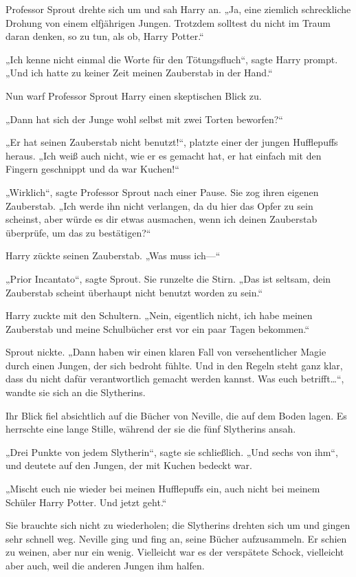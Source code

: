 {Professor Sprout drehte sich um und sah Harry an. „Ja, eine ziemlich schreckliche Drohung von einem elfjährigen Jungen. Trotzdem solltest du nicht im Traum daran denken, so zu tun, als ob, Harry Potter.“

„Ich kenne nicht einmal die Worte für den Tötungsfluch“, sagte Harry prompt. „Und ich hatte zu keiner Zeit meinen Zauberstab in der Hand.“

Nun warf Professor Sprout Harry einen skeptischen Blick zu.

„Dann hat sich der Junge wohl selbst mit zwei Torten beworfen?“

„Er hat seinen Zauberstab nicht benutzt!“, platzte einer der jungen Hufflepuffs heraus. „Ich weiß auch nicht, wie er es gemacht hat, er hat einfach mit den Fingern geschnippt und da war Kuchen!“

„Wirklich“, sagte Professor Sprout nach einer Pause. Sie zog ihren eigenen Zauberstab. „Ich werde ihn nicht verlangen, da du hier das Opfer zu sein scheinst, aber würde es dir etwas ausmachen, wenn ich deinen Zauberstab überprüfe, um das zu bestätigen?“

Harry zückte seinen Zauberstab. „Was muss ich—“

„Prior Incantato“, sagte Sprout. Sie runzelte die Stirn. „Das ist seltsam, dein Zauberstab scheint überhaupt nicht benutzt worden zu sein.“

Harry zuckte mit den Schultern. „Nein, eigentlich nicht, ich habe meinen Zauberstab und meine Schulbücher erst vor ein paar Tagen bekommen.“

Sprout nickte. „Dann haben wir einen klaren Fall von versehentlicher Magie durch einen Jungen, der sich bedroht fühlte. Und in den Regeln steht ganz klar, dass du nicht dafür verantwortlich gemacht werden kannst. Was euch betrifft…“, wandte sie sich an die Slytherins.

Ihr Blick fiel absichtlich auf die Bücher von Neville, die auf dem Boden lagen. Es herrschte eine lange Stille, während der sie die fünf Slytherins ansah.

„Drei Punkte von jedem Slytherin“, sagte sie schließlich. „Und sechs von ihm“, und deutete auf den Jungen, der mit Kuchen bedeckt war.

„Mischt euch nie wieder bei meinen Hufflepuffs ein, auch nicht bei meinem Schüler Harry Potter. Und jetzt geht.“

Sie brauchte sich nicht zu wiederholen; die Slytherins drehten sich um und gingen sehr schnell weg. Neville ging und fing an, seine Bücher aufzusammeln. Er schien zu weinen, aber nur ein wenig. Vielleicht war es der verspätete Schock, vielleicht aber auch, weil die anderen Jungen ihm halfen.

}
